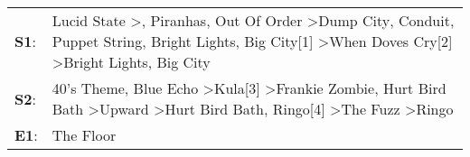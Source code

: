 \begin{supertabular}{p{0.03\textwidth}p{0.92\textwidth}}
 \textbf{S1}:  &  Lucid State\textsuperscript{} \textgreater {}\textsuperscript{}, \enspace Piranhas\textsuperscript{}, \enspace Out Of Order\textsuperscript{} \textgreater \enspace Dump City\textsuperscript{}, \enspace Conduit\textsuperscript{}, \enspace Puppet String\textsuperscript{}, \enspace Bright Lights, Big City[1]\textsuperscript{} \textgreater \enspace When Doves Cry[2]\textsuperscript{} \textgreater \enspace Bright Lights, Big City\textsuperscript{}  \enspace  \\
 \textbf{S2}:  &             40's Theme\textsuperscript{}, \enspace Blue Echo\textsuperscript{} \textgreater \enspace Kula[3]\textsuperscript{} \textgreater \enspace Frankie Zombie\textsuperscript{}, \enspace Hurt Bird Bath\textsuperscript{} \textgreater \enspace Upward\textsuperscript{} \textgreater \enspace Hurt Bird Bath\textsuperscript{}, \enspace Ringo[4]\textsuperscript{} \textgreater \enspace The Fuzz\textsuperscript{} \textgreater \enspace Ringo\textsuperscript{}  \enspace  \\
 \textbf{E1}:  &                                                                                                                                                                                                                                                                                                                                                                                                                                                The Floor\textsuperscript{}  \enspace  \\
\end{supertabular}

